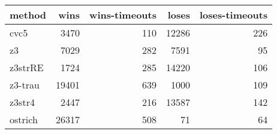 \begin{tabular}{lrrrr}
\hline
 method   &   wins &   wins-timeouts &   loses &   loses-timeouts \\
\hline
 cvc5     &   3470 &             110 &   12286 &              226 \\
 z3       &   7029 &             282 &    7591 &               95 \\
 z3strRE  &   1724 &             285 &   14220 &              106 \\
 z3-trau  &  19401 &             639 &    1000 &              109 \\
 z3str4   &   2447 &             216 &   13587 &              142 \\
 ostrich  &  26317 &             508 &      71 &               64 \\
\hline
\end{tabular}
